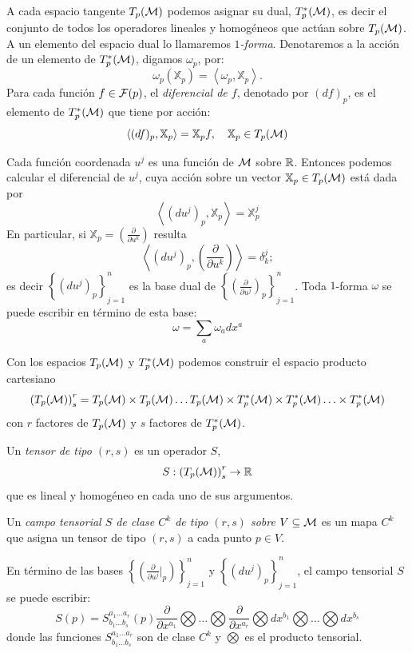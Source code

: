 A cada espacio tangente $T_p(\mathcal{M})$ podemos asignar su dual, $T_p^*(\mathcal{M})$, es decir
el conjunto de  todos los operadores lineales y  homog\'eneos que act\'uan sobre
$T_p(\mathcal{M})$.   A    un   elemento   del   espacio   dual    lo   llamaremos   {\it
  $1$-forma}. Denotaremos a  la acci\'on de un elemento  de $T_p^*(\mathcal{M})$, digamos
$\omega_p$, por:
%
\[
\omega_p(\mathbb{X}_p) = \left\langle \omega_p , \mathbb{X}_p \right\rangle.
\]
%
Para cada  funci\'on $f \in  \mathcal{F}(p)$, el {\it  diferencial de $f$},  denotado por
$(df)_p$, es el elemento de $T_p^*(\mathcal{M})$ que tiene por acci\'on:
%
\[
\left\langle (df)_p ,  \mathbb{X}_p \right\rangle = \mathbb{X}_p f,  \quad \mathbb{X}_p \in
T_p(\mathcal{M})
\]

Cada funci\'on coordenada $u^j$ es una funci\'on de $\mathcal{M}$ sobre $\mathbb{R}$. Entonces
podemos  calcular  el  diferencial  de  $u^j$, cuya  acci\'on  sobre  un  vector
$\mathbb{X}_p \in T_p(\mathcal{M})$ est\'a dada por
%
\[
 \left\langle (du^j)_p , \mathbb{X}_p \right\rangle = \mathbb{X}_p^j
\]
%
En particular,  si $\mathbb{X}_p =  \left(\frac{\partial}{\partial u^k} \right)$
resulta
%
\[
\left\langle   (du^j)_p   ,   \left(   \frac{\partial}{\partial   u^k}   \right)
\right\rangle = \delta_k^j;
 \]
%
 es decir $\left\{ (du^j)_p \right\}_{j=1}^n$ es la base dual de $\left\{ \left(
     \frac{\partial}{\partial  u^j} \right)_p \right\}_{j=1}^n$.  Toda $1$-forma
 $\omega$ se puede escribir en t\'ermino de esta base:
%
\[
\omega = \sum_a \omega_a dx^a
\]

Con los espacios  $T_p(\mathcal{M})$ y $T_p^*(\mathcal{M})$ podemos construir  el espacio producto
cartesiano
%
\[
\left(  T_p(\mathcal{M})  \right)_s^r =  T_p(\mathcal{M})  \times  T_p(\mathcal{M})  \ldots T_p(\mathcal{M})  \times
T_p^*(\mathcal{M}) \times T_p^*(\mathcal{M}) \ldots \times T_p^*(\mathcal{M})
\]
%
con $r$ factores de $T_p(\mathcal{M})$ y $s$ factores de $T_p^*(\mathcal{M})$.

\begin{definicion}
  Un {\it tensor de tipo $(r,s)$} es un operador $S$,
  \[
  S: \left( T_p(\mathcal{M}) \right)_s^r \rightarrow \mathbb{R}
  \]
  que es lineal y homog\'eneo en cada uno de sus argumentos.
\end{definicion}

\begin{definicion}
  Un {\it campo tensorial $S$ de  clase $C^k$ de tipo $(r,s)$ sobre $V \subseteq
    \mathcal{M}$} es un mapa  $C^k$ que asigna un tensor de tipo  $(r,s)$ a cada punto $p
  \in V$.
\end{definicion}
%
En  t\'ermino  de las  bases  $\left\{  \left( \frac{\partial}{\partial  u^j}|_p
  \right)  \right\}_{j=1}^n$  y $\left\{  (du^j)_p  \right\}_{j=1}^n$, el  campo
tensorial $S$ se puede escribir:
%
\[
S(p) = S^{a_1 \ldots  a_r}_{b_1 \ldots b_s}(p) \frac{\partial}{\partial x^{a_1}}
\bigotimes   \ldots  \bigotimes  \frac{\partial}{\partial   x^{a_r}}  \bigotimes
dx^{b_1} \bigotimes \ldots \bigotimes dx^{b_s}
\]
%
\noindent donde  las funciones $S^{a_1 \ldots a_r}_{b_1 \ldots b_s}$  son de clase
$C^k$ y $\bigotimes$ es el producto tensorial.


